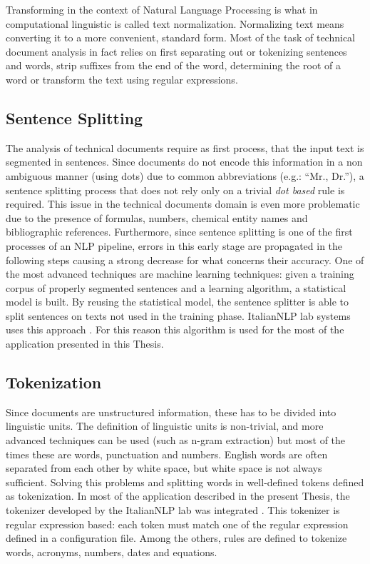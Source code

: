 \documentclass[]{book}
\begin{document}
Transforming in the context of Natural Language Processing is what in
computational linguistic is called text normalization. Normalizing text
means converting it to a more convenient, standard form. Most of the
task of technical document analysis in fact relies on first separating
out or tokenizing sentences and words, strip suffixes from the end of
the word, determining the root of a word or transform the text using
regular expressions.

\subsection{Sentence Splitting}\label{sotatoolstransformsentencesplit}

The analysis of technical documents require as first process, that the
input text is segmented in sentences. Since documents do not encode this
information in a non ambiguous manner (using dots) due to common
abbreviations (e.g.: ``Mr., Dr.''), a sentence splitting process that
does not rely only on a trivial \emph{dot based} rule is required. This
issue in the technical documents domain is even more problematic due to
the presence of formulas, numbers, chemical entity names and
bibliographic references. Furthermore, since sentence splitting is one
of the first processes of an NLP pipeline, errors in this early stage
are propagated in the following steps causing a strong decrease for what
concerns their accuracy. One of the most advanced techniques are machine
learning techniques: given a training corpus of properly segmented
sentences and a learning algorithm, a statistical model is built. By
reusing the statistical model, the sentence splitter is able to split
sentences on texts not used in the training phase. ItalianNLP lab
systems uses this approach \citep[\citet{attardi2009reverse},
\citet{attardi2009accurate}]{dell2009ensemble}. For this reason this
algorithm is used for the most of the application presented in this
Thesis.

\subsection{Tokenization}\label{tokenization}

Since documents are unstructured information, these has to be divided
into linguistic units. The definition of linguistic units is
non-trivial, and more advanced techniques can be used (such as n-gram
extraction) but most of the times these are words, punctuation and
numbers. English words are often separated from each other by white
space, but white space is not always sufficient. Solving this problems
and splitting words in well-defined tokens defined as tokenization. In
most of the application described in the present Thesis, the tokenizer
developed by the ItalianNLP lab was integrated
\citep{dell2009ensemble, attardi2009reverse, attardi2009accurate}. This
tokenizer is regular expression based: each token must match one of the
regular expression defined in a configuration file. Among the others,
rules are defined to tokenize words, acronyms, numbers, dates and
equations.
\end{document}
